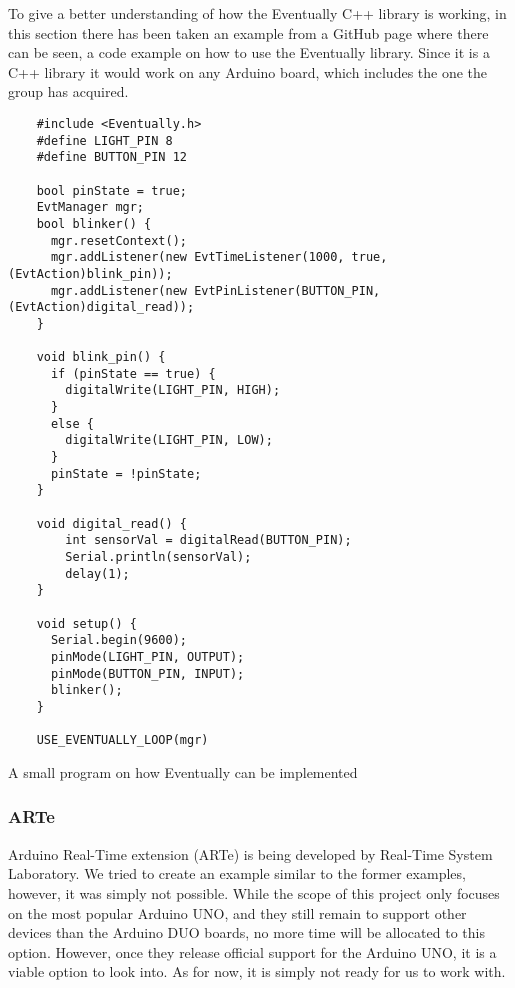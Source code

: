 To give a better understanding of how the Eventually C++ library is working, in this section there has been taken an example from a GitHub page \cite{bartlettEventually2022Bartlett} where there can be seen, a code example on how to use the Eventually library. Since it is a C++ library it would work on any Arduino board, which includes the one the group has acquired.


\begin{listing}
  \begin{verbatim}
    #include <Eventually.h>
    #define LIGHT_PIN 8
    #define BUTTON_PIN 12

    bool pinState = true;
    EvtManager mgr;
    bool blinker() {
      mgr.resetContext();
      mgr.addListener(new EvtTimeListener(1000, true, (EvtAction)blink_pin)); 
      mgr.addListener(new EvtPinListener(BUTTON_PIN, (EvtAction)digital_read));
    }

    void blink_pin() {
      if (pinState == true) {
        digitalWrite(LIGHT_PIN, HIGH);
      }
      else {
        digitalWrite(LIGHT_PIN, LOW);
      }
      pinState = !pinState;
    }

    void digital_read() {
        int sensorVal = digitalRead(BUTTON_PIN);
        Serial.println(sensorVal);
        delay(1);
    }

    void setup() {
      Serial.begin(9600);
      pinMode(LIGHT_PIN, OUTPUT);
      pinMode(BUTTON_PIN, INPUT);
      blinker();
    }

    USE_EVENTUALLY_LOOP(mgr)
  \end{verbatim}
  \caption{A small program on how Eventually can be implemented}
  \label{List: Eventually example}
\end{listing}



\subsubsection{ARTe}

Arduino Real-Time extension (ARTe) is being developed by Real-Time System Laboratory. We tried to create an example similar to the former examples, however, it was simply not possible. While the scope of this project only focuses on the most popular Arduino UNO, and they still remain to support other devices than the Arduino DUO boards, no more time will be allocated to this option. However, once they release official support for the Arduino UNO, it is a viable option to look into. As for now, it is simply not ready for us to work with.



